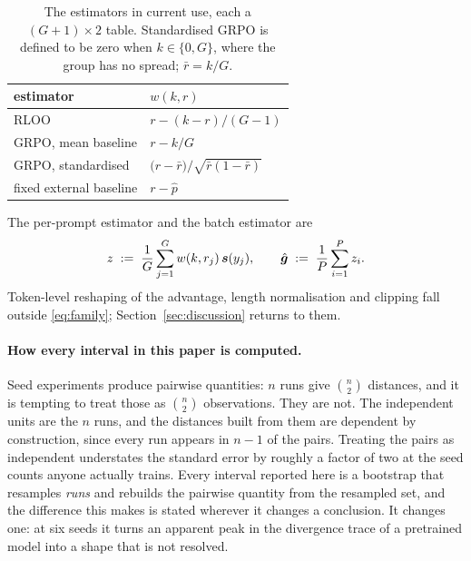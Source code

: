 \begin{table}[t]
  \centering
  \footnotesize
  \setlength{\tabcolsep}{3.5pt}
  \begin{tabular}{@{}ll@{}}
    \toprule
    estimator & $w(k, r)$ \\
    \midrule
    RLOO \citep{ahmadian2024rloo} & $r - (k - r)/(G-1)$ \\
    GRPO, mean baseline \citep{liu2025drgrpo} & $r - k/G$ \\
    GRPO, standardised \citep{shao2024deepseekmath}
      & $\big(r - \bar{r}\big)/\sqrt{\bar{r}(1 - \bar{r})}$ \\
    fixed external baseline & $r - \hat{p}$ \\
    \bottomrule
  \end{tabular}
  \caption{The estimators in current use, each a $(G+1)\times 2$ table. Standardised GRPO is
  defined to be zero when $k \in \{0, G\}$, where the group has no spread; $\bar{r} = k/G$.}
  \label{tab:family}
\end{table}

The per-prompt estimator and the batch estimator are
\begin{equation}
  z \;:=\; \frac{1}{G}\sum_{j=1}^{G} w(k, r_j)\, \bm{s}(y_j),
  \qquad
  \hat{\bm{g}} \;:=\; \frac{1}{P}\sum_{i=1}^{P} z_i .
\end{equation}
Token-level reshaping of the advantage, length normalisation and clipping fall outside
\eqref{eq:family}; Section~\ref{sec:discussion} returns to them.

\paragraph{How every interval in this paper is computed.} Seed experiments produce pairwise
quantities: $n$ runs give $\binom{n}{2}$ distances, and it is tempting to treat those as
$\binom{n}{2}$ observations. They are not. The independent units are the $n$ runs, and the
distances built from them are dependent by construction, since every run appears in $n-1$ of the
pairs. Treating the pairs as independent understates the standard error by roughly a factor of two
at the seed counts anyone actually trains. Every interval reported here is a bootstrap that
resamples \emph{runs} and rebuilds the pairwise quantity from the resampled set, and the difference
this makes is stated wherever it changes a conclusion. It changes one: at six seeds it turns an
apparent peak in the divergence trace of a pretrained model into a shape that is not resolved.

